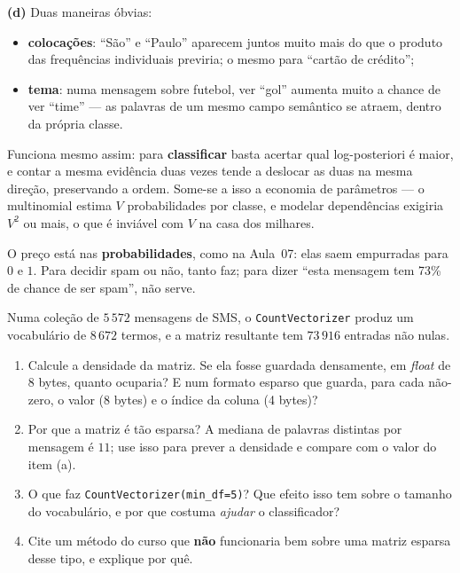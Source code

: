 \documentclass[11pt,a4paper]{article}
\begin{document}
\begin{solucao}
\smallskip
\textbf{(d)} Duas maneiras óbvias:
\begin{itemize}[leftmargin=1.4cm]
  \item \textbf{colocações}: ``São'' e ``Paulo'' aparecem juntos muito mais do
        que o produto das frequências individuais previria; o mesmo para ``cartão
        de crédito'';
  \item \textbf{tema}: numa mensagem sobre futebol, ver ``gol'' aumenta muito a
        chance de ver ``time'' --- as palavras de um mesmo campo semântico se
        atraem, dentro da própria classe.
\end{itemize}

Funciona mesmo assim: para
\textbf{classificar} basta acertar qual log-posteriori é maior, e contar a mesma
evidência duas vezes tende a deslocar as duas na mesma direção, preservando a
ordem. Some-se a isso a economia de parâmetros --- o multinomial estima $V$
probabilidades por classe, e modelar dependências exigiria $V^2$ ou mais, o que é
inviável com $V$ na casa dos milhares.

O preço está nas \textbf{probabilidades}, como na Aula~07: elas saem empurradas
para $0$ e $1$. Para decidir spam ou não, tanto
faz; para dizer ``esta mensagem tem 73\% de chance de ser spam'', não serve.
\end{solucao}

\begin{exercicio}
Numa coleção de $5\,572$ mensagens de SMS, o \texttt{CountVectorizer} produz um
vocabulário de $8\,672$ termos, e a matriz resultante tem $73\,916$ entradas não
nulas.
\begin{enumerate}[label=(\alph*),leftmargin=1.1cm]
  \item Calcule a densidade da matriz. Se ela fosse guardada densamente, em
        \emph{float} de 8 bytes, quanto ocuparia? E num formato esparso que
        guarda, para cada não-zero, o valor (8 bytes) e o índice da coluna
        (4 bytes)?
  \item Por que a matriz é tão esparsa? A mediana de palavras distintas por
        mensagem é $11$; use isso para prever a densidade e compare com o valor
        do item (a).
  \item O que faz \texttt{CountVectorizer(min\_df=5)}? Que efeito isso tem sobre
        o tamanho do vocabulário, e por que costuma \emph{ajudar} o
        classificador?
  \item Cite um método do curso que \textbf{não} funcionaria bem sobre uma matriz
        esparsa desse tipo, e explique por quê.
\end{enumerate}
\end{exercicio}
\end{document}
